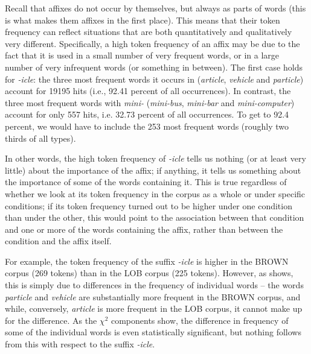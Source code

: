 Recall that affixes  do not occur by themselves, but always as parts of words (this is what makes them affixes  in the first place). This means that their token frequency  can reflect situations that are both quantitatively and qualitatively very different. Specifically, a high token frequency of an affix  may be due to the fact that it is used in a small number of very frequent words, or in a large number of very infrequent words (or something in between). The first case holds for \textit{-icle}: the three most frequent words it occurs in (\textit{article}, \textit{vehicle} and \textit{particle}) account for \num{19195} hits (i.e., 92.41 percent of all occurrences). In contrast, the three most frequent words with \textit{mini-} (\textit{mini\hyp{}bus}, \textit{mini\hyp{}bar} and \textit{mini\hyp{}computer}) account for only 557 hits, i.e. 32.73 percent of all occurrences. To get to 92.4 percent, we would have to include the 253 most frequent words (roughly two thirds of all  types).

In other words, the high token  frequency  of \textit{-icle} tells us nothing (or at least very little) about the importance of the affix;  if anything, it tells us something about the importance of some of the words containing it. This is true regardless of whether we look at its token frequency in the corpus as a whole or under specific conditions; if its token frequency  turned out to be higher under one condition than under the other, this would point to the association  between that condition and one or more of the words containing the affix,  rather than between the condition and the affix  itself.

For example, the token frequency  of the suffix  \textit{-icle} is higher in the BROWN  corpus (269 tokens) than in the LOB  corpus (225 tokens). However, as  shows, this is simply due to differences in the frequency of individual words -- the words \textit{particle} and \textit{vehicle} are substantially more frequent in the BROWN  corpus, and while, conversely, \textit{article} is more frequent in the LOB  corpus, it cannot make up for the difference. As the $\chi^2$  components show, the difference in frequency of some of the individual words is even statistically significant, but nothing follows from this with respect to the suffix  \textit{-icle}.

